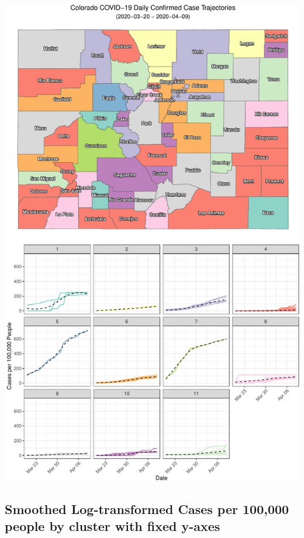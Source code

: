 \documentclass[]{article}
\begin{document}
\includegraphics{figs/county-clusters-smooth-raw-1}

\hypertarget{smoothed-log-transformed-cases-per-100000-people-by-cluster-with-fixed-y-axes}{%
\subsection{Smoothed Log-transformed Cases per 100,000 people by cluster
with fixed
y-axes}\label{smoothed-log-transformed-cases-per-100000-people-by-cluster-with-fixed-y-axes}}
\end{document}
